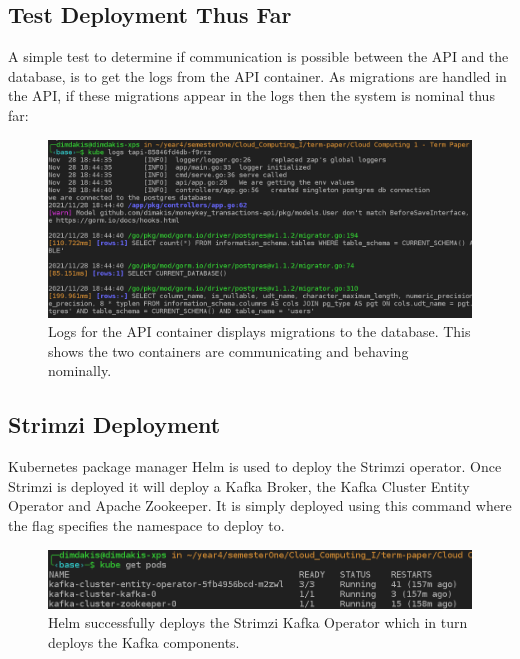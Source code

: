 \begin{flushleft}
    \subsection{Test Deployment Thus Far}
    A simple test to determine if communication is possible between the API and the database, is to get the logs from the API container. As migrations are handled in the API,
    if these migrations appear in the logs then the system is nominal thus far:
    \begin{figure} [ht]
        \begin{center}
            \includegraphics[width=1\textwidth]{figures/tapi-logs.png}
            \caption{Logs for the API container displays migrations to the database. This shows the two containers are communicating and behaving nominally.}
            \label{fig: 2.11}
        \end{center}
    \end{figure}
    \subsection{Strimzi Deployment}
    Kubernetes package manager Helm is used to deploy the Strimzi operator. Once Strimzi is deployed it will deploy a Kafka Broker, the Kafka Cluster Entity Operator and Apache Zookeeper.
    It is simply deployed using this command  where the  flag specifies the namespace to deploy to.
    \begin{figure} [ht]
        \begin{center}
            \includegraphics[width=1\textwidth]{figures/strimzi-deployed-kafka-componets.png}
            \caption{Helm successfully deploys the Strimzi Kafka Operator which in turn deploys the Kafka components.}
            \label{fig: 2.12}
        \end{center}
    \end{figure}

\end{flushleft}
